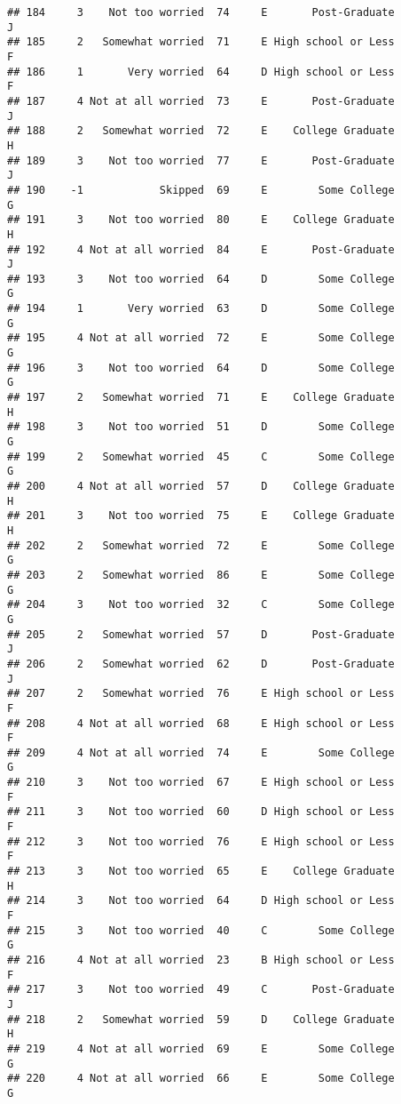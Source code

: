 \documentclass[
]{article}
\begin{document}
\begin{verbatim}
## 184     3    Not too worried  74     E       Post-Graduate         J
## 185     2   Somewhat worried  71     E High school or Less         F
## 186     1       Very worried  64     D High school or Less         F
## 187     4 Not at all worried  73     E       Post-Graduate         J
## 188     2   Somewhat worried  72     E    College Graduate         H
## 189     3    Not too worried  77     E       Post-Graduate         J
## 190    -1            Skipped  69     E        Some College         G
## 191     3    Not too worried  80     E    College Graduate         H
## 192     4 Not at all worried  84     E       Post-Graduate         J
## 193     3    Not too worried  64     D        Some College         G
## 194     1       Very worried  63     D        Some College         G
## 195     4 Not at all worried  72     E        Some College         G
## 196     3    Not too worried  64     D        Some College         G
## 197     2   Somewhat worried  71     E    College Graduate         H
## 198     3    Not too worried  51     D        Some College         G
## 199     2   Somewhat worried  45     C        Some College         G
## 200     4 Not at all worried  57     D    College Graduate         H
## 201     3    Not too worried  75     E    College Graduate         H
## 202     2   Somewhat worried  72     E        Some College         G
## 203     2   Somewhat worried  86     E        Some College         G
## 204     3    Not too worried  32     C        Some College         G
## 205     2   Somewhat worried  57     D       Post-Graduate         J
## 206     2   Somewhat worried  62     D       Post-Graduate         J
## 207     2   Somewhat worried  76     E High school or Less         F
## 208     4 Not at all worried  68     E High school or Less         F
## 209     4 Not at all worried  74     E        Some College         G
## 210     3    Not too worried  67     E High school or Less         F
## 211     3    Not too worried  60     D High school or Less         F
## 212     3    Not too worried  76     E High school or Less         F
## 213     3    Not too worried  65     E    College Graduate         H
## 214     3    Not too worried  64     D High school or Less         F
## 215     3    Not too worried  40     C        Some College         G
## 216     4 Not at all worried  23     B High school or Less         F
## 217     3    Not too worried  49     C       Post-Graduate         J
## 218     2   Somewhat worried  59     D    College Graduate         H
## 219     4 Not at all worried  69     E        Some College         G
## 220     4 Not at all worried  66     E        Some College         G

\end{verbatim}
\end{document}

